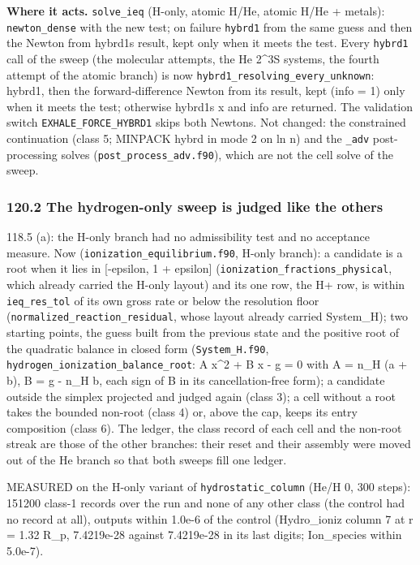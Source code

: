 \documentclass[english,a4paper]{my_memo}
\begin{document}
\textbf{Where it acts.} \texttt{solve\_ieq} (H-only, atomic H/He, atomic H/He + metals):
\texttt{newton\_dense} with the new test; on failure \texttt{hybrd1} from the same guess and
then the Newton from hybrd1\textquotesingle s result, kept only when it meets the test. Every
\texttt{hybrd1} call of the sweep (the molecular attempts, the He 2\^{}3S systems, the
fourth attempt of the atomic branch) is now \texttt{hybrd1\_resolving\_every\_unknown}:
hybrd1, then the forward-difference Newton from its result, kept (info = 1)
only when it meets the test; otherwise hybrd1\textquotesingle s x and info are returned. The
validation switch \texttt{EXHALE\_FORCE\_HYBRD1} skips both Newtons. Not changed: the
constrained continuation (class 5; MINPACK hybrd in mode 2 on ln n) and the
\texttt{\_adv} post-processing solves (\texttt{post\_process\_adv.f90}), which are not the
cell solve of the sweep.

\subsubsection{120.2 The hydrogen-only sweep is judged like the others}\label{1202-the-hydrogen-only-sweep-is-judged-like-the-others}

118.5 (a): the H-only branch had no admissibility test and no acceptance
measure. Now (\texttt{ionization\_equilibrium.f90}, H-only branch): a candidate is a
root when it lies in {[}-epsilon, 1 + epsilon{]} (\texttt{ionization\_fractions\_physical},
which already carried the H-only layout) and its one row, the H+ row, is
within \texttt{ieq\_res\_tol} of its own gross rate or below the resolution floor
(\texttt{normalized\_reaction\_residual}, whose layout already carried System\_H); two
starting points, the guess built from the previous state and the positive
root of the quadratic balance in closed form (\texttt{System\_H.f90},
\texttt{hydrogen\_ionization\_balance\_root}: A x\^{}2 + B x - g = 0 with A = n\_H (a + b),
B = g - n\_H b, each sign of B in its cancellation-free form); a candidate
outside the simplex projected and judged again (class 3); a cell without a
root takes the bounded non-root (class 4) or, above the cap, keeps its entry
composition (class 6). The ledger, the class record of each cell and the
non-root streak are those of the other branches: their reset and their
assembly were moved out of the He branch so that both sweeps fill one ledger.

MEASURED on the H-only variant of \texttt{hydrostatic\_column} (He/H 0, 300 steps):
151200 class-1 records over the run and none of any other class (the control
had no record at all), outputs within 1.0e-6 of the control (Hydro\_ioniz
column 7 at r = 1.32 R\_p, 7.4219e-28 against 7.4219e-28 in its last digits;
Ion\_species within 5.0e-7).
\end{document}
